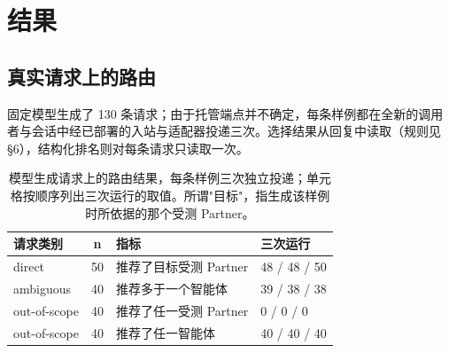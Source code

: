 \documentclass[11pt,a4paper]{article}
\begin{document}
\section{结果}

\subsection{真实请求上的路由}

固定模型生成了 130 条请求；由于托管端点并不确定，每条样例都在全新的调用者与会话中经已部署的入站与适配器投递三次。选择结果从回复中读取（规则见 §6），结构化排名则对每条请求只读取一次。

\begin{table}[htbp]

\centering

\small

\caption{模型生成请求上的路由结果，每条样例三次独立投递；单元格按顺序列出三次运行的取值。所谓"目标"，指生成该样例时所依据的那个受测 Partner。}\label{tab:4}

\begin{tabularx}{\textwidth}{@{}lcXp{2.6cm}@{}}

\toprule

\textbf{请求类别} & \textbf{n} & \textbf{指标} & \textbf{三次运行} \\

\midrule

direct & 50 & 推荐了目标受测 Partner & 48 / 48 / 50 \\

ambiguous & 40 & 推荐多于一个智能体 & 39 / 38 / 38 \\

out-of-scope & 40 & 推荐了任一受测 Partner & 0 / 0 / 0 \\

out-of-scope & 40 & 推荐了任一智能体 & 40 / 40 / 40 \\

\bottomrule

\end{tabularx}

\end{table}
\end{document}
